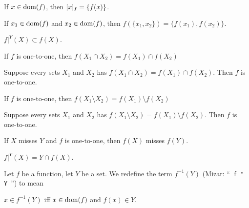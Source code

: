 \documentclass{article}
\begin{document}
\begin{thm}
\item\label{funct1:59} If $x\in\dom(f)$, then $\RelIm{f}{x}=\{f(x)\}$.
\item\label{funct1:60} If $x_{1}\in\dom(f)$ and $x_{2}\in\dom(f)$,
  then $f(\{x_{1},x_{2}\})=\{f(x_{1}),f(x_{2})\}$.
\item\label{funct1:61} $f|^{Y}(X)\subset f(X)$.
\item\label{funct1:62} If $f$ is one-to-one, then $f(X_{1}\cap X_{2})=f(X_{1})\cap f(X_{2})$
\item\label{funct1:63} Suppose every sets $X_{1}$ and $X_{2}$ has
  $f(X_{1}\cap X_{2})=f(X_{1})\cap f(X_{2})$.
  Then $f$ is one-to-one.
\item\label{funct1:64} If $f$ is one-to-one, then $f(X_{1}\setminus X_{2})=f(X_{1})\setminus f(X_{2})$
\item\label{funct1:65} Suppose every sets $X_{1}$ and $X_{2}$ has
  $f(X_{1}\setminus X_{2})=f(X_{1})\setminus f(X_{2})$.
  Then $f$ is one-to-one.
\item\label{funct1:66} If $X$ misses $Y$ and $f$ is one-to-one, then
  $f(X)$ misses $f(Y)$.
\item\label{funct1:67} $f|^{Y}(X)=Y\cap f(X)$.
\end{thm}

\begin{definition}
Let $f$ be a function, let $Y$ be a set. We redefine the term
$f^{-1}(Y)$ (Mizar: ``\verb# f " Y #'') to mean
\begin{defn}
\item $x\in f^{-1}(Y)$ iff $x\in\dom(f)$ and $f(x)\in Y$.
\end{defn}
\end{definition}
\end{document}
